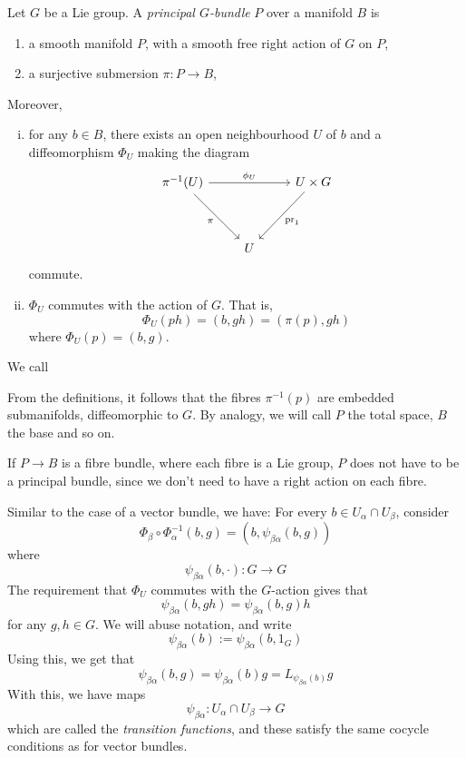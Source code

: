 \documentclass{article}
\begin{document}
\begin{definition}
     Let \(G\) be a Lie group. A \emph{principal \(G\)-bundle} \(P\) over a manifold \(B\) is
    \begin{enumerate}
        \item a smooth manifold \(P\), with a smooth free right action of \(G\) on \(P\),
        \item a surjective submersion \(\pi : P \to B\),
    \end{enumerate}
    Moreover, 
    \begin{enumerate}[(i)]
        \item 
        for any \(b \in B\), there exists an open neighbourhood \(U\) of \(b\) and a diffeomorphism \(\Phi_U\) making the diagram
        \[\begin{tikzcd}
            {\pi^{-1}(U)} && {U \times G} \\
            \\
            & U
            \arrow["\pi"', from=1-1, to=3-2]
            \arrow["{\phi_U}", from=1-1, to=1-3]
            \arrow["{\pr_1}", from=1-3, to=3-2]
        \end{tikzcd}\]
        commute.
        \item \(\Phi_U\) commutes with the action of \(G\). That is,
        \[\Phi_U(ph) = (b, gh) = (\pi(p), gh)\]
        where \(\Phi_U(p) = (b, g)\). 
    \end{enumerate}
    We call
\end{definition}

\begin{remark}
    From the definitions, it follows that the fibres \(\pi^{-1}(p)\) are embedded submanifolds, diffeomorphic to \(G\). By analogy, we will call \(P\) the total space, \(B\) the base and so on.
\end{remark}

\begin{remark}
    [Warning] If \(P \to B\) is a fibre bundle, where each fibre is a Lie group, \(P\) does not have to be a principal bundle, since we don't need to have a right action on each fibre.
\end{remark}

Similar to the case of a vector bundle, we have: For every \(b \in U_\alpha \cap U_\beta\), consider
\[\Phi_\beta \circ \Phi_\alpha^{-1}(b, g) = (b, \psi_{\beta\alpha}(b, g))\]
where
\[\psi_{\beta\alpha}(b, \cdot) : G \to G\]
The requirement that \(\Phi_U\) commutes with the \(G\)-action gives that
\[\psi_{\beta\alpha}(b, gh) = \psi_{\beta\alpha}(b, g)h\]
for any \(g, h \in G\). We will abuse notation, and write
\[\psi_{\beta\alpha}(b) := \psi_{\beta\alpha}(b, 1_G)\]
Using this, we get that
\[\psi_{\beta\alpha}(b, g) = \psi_{\beta\alpha}(b)g = L_{\psi_{\beta\alpha}(b)}g\]
With this, we have maps
\[\psi_{\beta\alpha} : U_\alpha \cap U_\beta \to G\]
which are called the \emph{transition functions}, and these satisfy the same cocycle conditions as for vector bundles.
\end{document}
